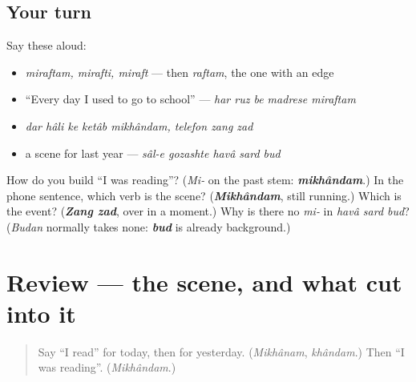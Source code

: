 \subsection*{Your turn}
Say these aloud:

\begin{itemize}
\raggedright
  \item \emph{miraftam, mirafti, miraft} — then \emph{raftam}, the one with an edge
  \item \textquotedblleft{}Every day I used to go to school\textquotedblright{} — \emph{har ruz be madrese miraftam}
  \item \emph{dar hâli ke ketâb mikhândam, telefon zang zad}
  \item a scene for last year — \emph{sâl-e gozashte havâ sard bud}
\end{itemize}

\begin{tcolorbox}[breakable,colback=teal!4,colframe=teal!35!black,title={Before you move on}]
How do you build \textquotedblleft{}I was reading\textquotedblright{}? (\emph{Mi-} on the past stem: \emph{\textbf{mikhândam}}.) In the phone sentence, which verb is the scene? (\emph{\textbf{Mikhândam}}, still running.) Which is the event? (\emph{\textbf{Zang zad}}, over in a moment.) Why is there no \emph{mi-} in \emph{havâ sard bud}? (\emph{Budan} normally takes none: \emph{\textbf{bud}} is already background.)
\end{tcolorbox}
\section[(review)]{Review — the scene, and what cut into it}

\label{lesson:FA-R290-the-past-two-ways}



\begin{quote}
Say \textquotedblleft{}I read\textquotedblright{} for today, then for yesterday. (\emph{Mikhânam}, \emph{khândam}.) Then \textquotedblleft{}I was reading\textquotedblright{}. (\emph{Mikhândam}.)
\end{quote}

